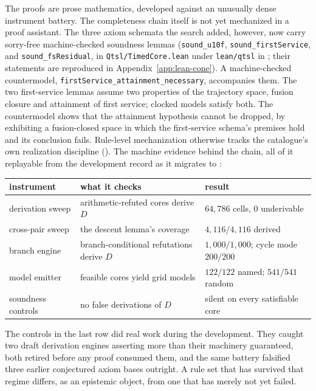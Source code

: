The proofs are prose mathematics, developed against an unusually
dense instrument battery. The completeness chain itself is not yet
mechanized in a proof assistant. The three axiom schemata the search
added, however, now carry sorry-free machine-checked soundness
lemmas (\texttt{sound\_u10f}, \texttt{sound\_firstService}, and
\texttt{sound\_fsResidual}, in \texttt{Qtsl/TimedCore.lean} under
\texttt{lean/qtsl} in ; their
statements are reproduced in Appendix~\ref{app:lean-cone}). A
machine-checked countermodel,
\texttt{firstService\_attainment\_necessary}, accompanies them. The
two first-service lemmas assume two properties of the trajectory space,
fusion closure and attainment of first service; clocked models
satisfy both. The countermodel shows that the attainment hypothesis
cannot be dropped, by exhibiting a fusion-closed space in which the
first-service schema's premises hold and its conclusion fails.
Rule-level mechanization otherwise tracks the
catalogue's own realization discipline (). The machine evidence behind the chain, all of it
replayable from the development record as it migrates to
:

\begin{center}
\begin{tabular}{@{}lll@{}}
\toprule
instrument & what it checks & result \\
\midrule
derivation sweep & arithmetic-refuted cores derive $D$ &
  $64{,}786$ cells, $0$ underivable \\
cross-pair sweep & the descent lemma's coverage &
  $4{,}116/4{,}116$ derived \\
branch engine & branch-conditional refutations derive $D$ &
  $1{,}000/1{,}000$; cycle mode $200/200$ \\
model emitter & feasible cores yield grid models &
  $122/122$ named; $541/541$ random \\
soundness controls & no false derivations of $D$ &
  silent on every satisfiable core \\
\bottomrule
\end{tabular}
\end{center}

The controls in the last row did real work during the development.
They caught two draft derivation engines asserting more than their
machinery guaranteed, both retired before any proof consumed them,
and the same battery falsified three earlier conjectured axiom bases
outright. A rule set that has survived that regime differs, as an
epistemic object, from one that has merely not yet failed.

